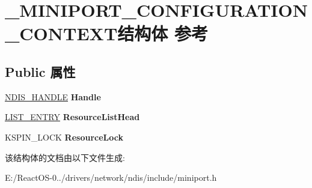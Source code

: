 \hypertarget{struct___m_i_n_i_p_o_r_t___c_o_n_f_i_g_u_r_a_t_i_o_n___c_o_n_t_e_x_t}{}\section{\+\_\+\+M\+I\+N\+I\+P\+O\+R\+T\+\_\+\+C\+O\+N\+F\+I\+G\+U\+R\+A\+T\+I\+O\+N\+\_\+\+C\+O\+N\+T\+E\+X\+T结构体 参考}
\label{struct___m_i_n_i_p_o_r_t___c_o_n_f_i_g_u_r_a_t_i_o_n___c_o_n_t_e_x_t}
\subsection*{Public 属性}
\begin{DoxyCompactItemize}
\item 
\mbox{\label{struct___m_i_n_i_p_o_r_t___c_o_n_f_i_g_u_r_a_t_i_o_n___c_o_n_t_e_x_t_a23761872c9f679a675348a33c715996b}} 
\hyperlink{interfacevoid}{N\+D\+I\+S\+\_\+\+H\+A\+N\+D\+LE} {\bfseries Handle}
\item 
\mbox{\label{struct___m_i_n_i_p_o_r_t___c_o_n_f_i_g_u_r_a_t_i_o_n___c_o_n_t_e_x_t_aba69f6964db705a860cab8d774732060}} 
\hyperlink{struct___l_i_s_t___e_n_t_r_y}{L\+I\+S\+T\+\_\+\+E\+N\+T\+RY} {\bfseries Resource\+List\+Head}
\item 
\mbox{\label{struct___m_i_n_i_p_o_r_t___c_o_n_f_i_g_u_r_a_t_i_o_n___c_o_n_t_e_x_t_a57d444c31fef8371c6fe3505f7a70331}} 
K\+S\+P\+I\+N\+\_\+\+L\+O\+CK {\bfseries Resource\+Lock}
\end{DoxyCompactItemize}


该结构体的文档由以下文件生成\+:\begin{DoxyCompactItemize}
\item 
E\+:/\+React\+O\+S-\/0../drivers/network/ndis/include/miniport.\+h\end{DoxyCompactItemize}
